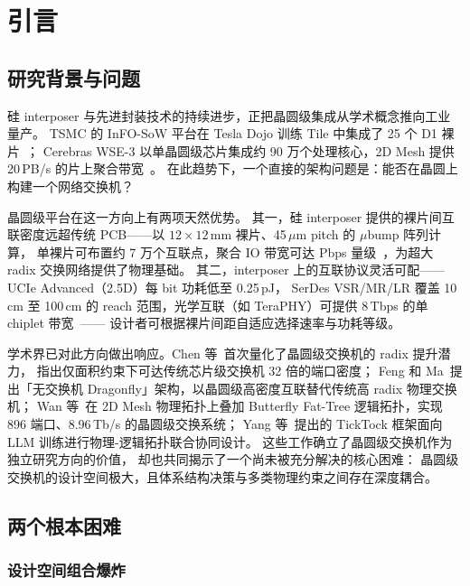 \chapter{引言}\label{chap:intro}

\section{研究背景与问题}\label{sec:intro-bg}

硅 interposer 与先进封装技术的持续进步，正把晶圆级集成从学术概念推向工业量产。
TSMC 的 InFO-SoW 平台在 Tesla Dojo 训练 Tile 中集成了 25 个 D1 裸片~\cite{tesla2022dojo}；
Cerebras WSE-3 以单晶圆级芯片集成约 90 万个处理核心，2D Mesh 提供 20\,PB/s 的片上聚合带宽~\cite{cerebras2022wse2}。
在此趋势下，一个直接的架构问题是：能否在晶圆上构建一个网络交换机？

晶圆级平台在这一方向上有两项天然优势。
其一，硅 interposer 提供的裸片间互联密度远超传统 PCB——以 $12\times12$\,mm 裸片、45\,$\mu$m pitch 的 $\mu$bump 阵列计算，
单裸片可布置约 7 万个互联点，聚合 IO 带宽可达 Pbps 量级~\cite{ucie2.0-2024}，为超大 radix 交换网络提供了物理基础。
其二，interposer 上的互联协议灵活可配——UCIe Advanced（2.5D）每 bit 功耗低至 0.25\,pJ，
SerDes VSR/MR/LR 覆盖 10\,cm 至 100\,cm 的 reach 范围，光学互联（如 TeraPHY）可提供 8\,Tbps 的单 chiplet 带宽~\cite{oif-cei-5.1}——
设计者可根据裸片间距自适应选择速率与功耗等级。

学术界已对此方向做出响应。Chen 等~\cite{chen2024waferscale}首次量化了晶圆级交换机的 radix 提升潜力，
指出仅面积约束下可达传统芯片级交换机 32 倍的端口密度；
Feng 和 Ma~\cite{feng2024switchless}提出「无交换机 Dragonfly」架构，以晶圆级高密度互联替代传统高 radix 物理交换机；
Wan 等~\cite{wan2024architectural}在 2D Mesh 物理拓扑上叠加 Butterfly Fat-Tree 逻辑拓扑，实现 896 端口、8.96\,Tb/s 的晶圆级交换系统；
Yang 等~\cite{yang2025pd}提出的 TickTock 框架面向 LLM 训练进行物理-逻辑拓扑联合协同设计。
这些工作确立了晶圆级交换机作为独立研究方向的价值，
却也共同揭示了一个尚未被充分解决的核心困难：
晶圆级交换机的设计空间极大，且体系结构决策与多类物理约束之间存在深度耦合。

\section{两个根本困难}\label{sec:intro-difficulties}

\subsection{设计空间组合爆炸}\label{sec:intro-space}

